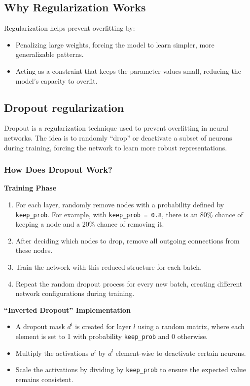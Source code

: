 \documentclass[letterpaper,12pt,notitlepage,twoside]{report}
\begin{document}
\subsection*{Why Regularization Works}
Regularization helps prevent overfitting by:
\begin{itemize}[nosep]
    \item Penalizing large weights, forcing the model to learn simpler, more generalizable patterns.
    \item Acting as a constraint that keeps the parameter values small, reducing the model's capacity to overfit.
\end{itemize}

\subsection*{Dropout regularization}
Dropout is a regularization technique used to prevent overfitting in neural networks. The idea is to randomly ``drop'' or deactivate a subset of neurons during training, forcing the network to learn more robust representations.

\subsubsection*{How Does Dropout Work?}
\textbf{Training Phase}
\begin{enumerate}
    \item For each layer, randomly remove nodes with a probability defined by \texttt{keep\_prob}. For example, with \texttt{keep\_prob = 0.8}, there is an 80\% chance of keeping a node and a 20\% chance of removing it.
    \item After deciding which nodes to drop, remove all outgoing connections from these nodes.
    \item Train the network with this reduced structure for each batch.
    \item Repeat the random dropout process for every new batch, creating different network configurations during training.
\end{enumerate}

\textbf{``Inverted Dropout'' Implementation}
\begin{itemize}
    \item A dropout mask \( d^l \) is created for layer \( l \) using a random matrix, where each element is set to 1 with probability \texttt{keep\_prob} and 0 otherwise.
    \item Multiply the activations \( a^l \) by \( d^l \) element-wise to deactivate certain neurons.
    \item Scale the activations by dividing by \texttt{keep\_prob} to ensure the expected value remains consistent.
\end{itemize}
\end{document}
